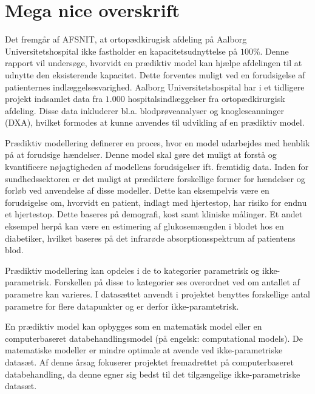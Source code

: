\section{Mega nice overskrift}

Det fremgår af AFSNIT, at ortopædkirugisk afdeling på Aalborg Universitetshospital ikke fastholder en kapacitetsudnyttelse på $100$\%. Denne rapport vil undersøge, hvorvidt en prædiktiv model kan hjælpe afdelingen til at udnytte den eksisterende kapacitet. Dette forventes muligt ved en forudsigelse af patienternes indlæggelsesvarighed. Aalborg Universitetshospital har i et tidligere projekt indsamlet data fra $1.000$ hospitalsindlæggelser fra ortopædkirurgisk afdeling. Disse data inkluderer bl.a. blodprøveanalyser og knoglescanninger (DXA), hvilket formodes at kunne anvendes til udvikling af en prædiktiv model. 

\noindent
Prædiktiv modellering definerer en proces, hvor en model udarbejdes med henblik på at forudsige hændelser. Denne model skal gøre det muligt at forstå og kvantificere nøjagtigheden af modellens forudsigelser ift. fremtidig data.\cite{Kuhn2013} 
Inden for sundhedssektoren er det muligt at prædiktere forskellige former for hændelser og forløb ved anvendelse af disse modeller. Dette kan eksempelvis være en forudsigelse om, hvorvidt en patient, indlagt med hjertestop, har risiko for endnu et hjertestop. Dette baseres på demografi, kost samt kliniske målinger. Et andet eksempel herpå kan være en estimering af glukosemængden i blodet hos en diabetiker, hvilket baseres på det infrarøde absorptionsspektrum af patientens blod.\cite{Hastie2008}

\noindent
Prædiktiv modellering kan opdeles i de to kategorier parametrisk og ikke-parametrisk. Forskellen på disse to kategorier ses overordnet ved om antallet af parametre kan varieres. I datasættet anvendt i projektet benyttes forskellige antal parametre for flere datapunkter og er derfor ikke-paramtetrisk.\cite{Sheskin2000}

\noindent
En prædiktiv model kan opbygges som en matematisk model eller en computerbaseret databehandlingsmodel (på engelsk: computational models). De matematiske modeller er mindre optimale at avende ved ikke-parametriske datasæt. Af denne årsag fokuserer projektet fremadrettet på computerbaseret databehandling, da denne egner sig bedst til det tilgængelige ikke-parametriske datasæt. \cite{Sheskin2000} 